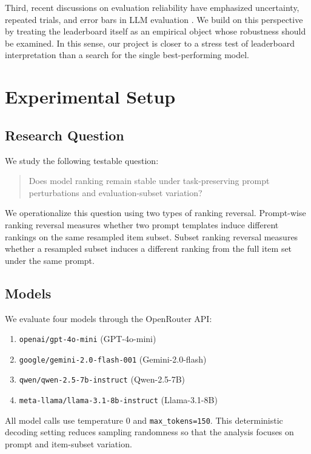 \documentclass[11pt]{article}
\theoremstyle{definition}
\begin{document}
Third, recent discussions on evaluation reliability have emphasized uncertainty, repeated trials, and error bars in LLM evaluation \cite{miller2024errorbars, fourrier2024openllm}. We build on this perspective by treating the leaderboard itself as an empirical object whose robustness should be examined. In this sense, our project is closer to a stress test of leaderboard interpretation than a search for the single best-performing model.

\section{Experimental Setup}

\subsection{Research Question}

We study the following testable question:
\begin{quote}
Does model ranking remain stable under task-preserving prompt perturbations and evaluation-subset variation?
\end{quote}

We operationalize this question using two types of ranking reversal. Prompt-wise ranking reversal measures whether two prompt templates induce different rankings on the same resampled item subset. Subset ranking reversal measures whether a resampled subset induces a different ranking from the full item set under the same prompt.

\subsection{Models}

We evaluate four models through the OpenRouter API:
\begin{enumerate}[leftmargin=3.75em]
    \item \texttt{openai/gpt-4o-mini} (GPT-4o-mini)
    \item \texttt{google/gemini-2.0-flash-001} (Gemini-2.0-flash)
    \item \texttt{qwen/qwen-2.5-7b-instruct} (Qwen-2.5-7B)
    \item \texttt{meta-llama/llama-3.1-8b-instruct} (Llama-3.1-8B)
\end{enumerate}

All model calls use temperature $0$ and \texttt{max\_tokens=150}. This deterministic decoding setting reduces sampling randomness so that the analysis focuses on prompt and item-subset variation.
\end{document}

